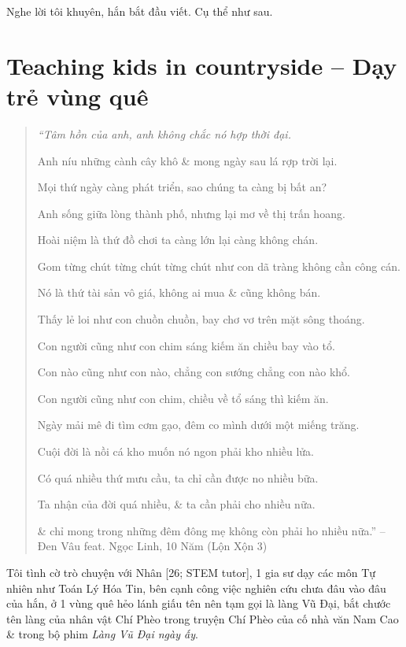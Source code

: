 \documentclass[12pt,oneside]{book}
\begin{document}
Nghe lời tôi khuyên, hắn bắt đầu viết. Cụ thể như sau.

\section{Teaching kids in countryside -- Dạy trẻ vùng quê}

\begin{quote}\small\it
	``Tâm hồn của anh, anh không chắc nó hợp thời đại.
	
	Anh níu những cành cây khô \& mong ngày sau lá rợp trời lại.
	
	Mọi thứ ngày càng phát triển, sao chúng ta càng bị bất an?
	
	Anh sống giữa lòng thành phố, nhưng lại mơ về thị trấn hoang.
	
	Hoài niệm là thứ đồ chơi ta càng lớn lại càng không chán.
	
	Gom từng chút từng chút từng chút như con dã tràng không cần công cán.
	
	Nó là thứ tài sản vô giá, không ai mua \& cũng không bán.
	
	Thấy lẻ loi như con chuồn chuồn, bay chơ vơ trên mặt sông thoáng.
	
	Con người cũng như con chim sáng kiếm ăn chiều bay vào tổ.
	
	Con nào cũng như con nào, chẳng con sướng chẳng con nào khổ.
	
	Con người cũng như con chim, chiều về tổ sáng thì kiếm ăn.
	
	Ngày mải mê đi tìm cơm gạo, đêm co mình dưới một miếng trăng.
	
	Cuội đời là nồi cá kho muốn nó ngon phải kho nhiều lửa.
	
	Có quá nhiều thứ mưu cầu, ta chỉ cần được no nhiều bữa.
	
	Ta nhận của đời quá nhiều, \& ta cần phải cho nhiều nữa.
	
	\& chỉ mong trong những đêm đông mẹ không còn phải ho nhiều nữa.'' -- {\sc Đen Vâu} feat. {\sc Ngọc Linh}, 10 Năm (Lộn Xộn 3)
\end{quote}
Tôi tình cờ trò chuyện với {\sf Nhân [26; STEM tutor]}, 1 gia sư dạy các môn Tự nhiên như Toán Lý Hóa Tin, bên cạnh công việc nghiên cứu chưa đâu vào đâu của hắn, ở 1 vùng quê hẻo lánh giấu tên nên tạm gọi là làng {\sf Vũ Đại}, bắt chước tên làng của nhân vật {\sf Chí Phèo} trong truyện {\sf Chí Phèo} của cố nhà văn {\sc Nam Cao} \& trong bộ phim {\it Làng Vũ Đại ngày ấy}.
\end{document}
